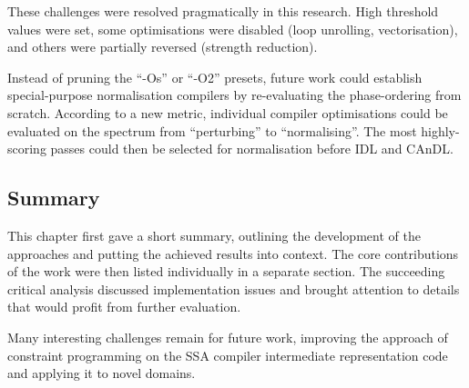     These challenges were resolved pragmatically in this research.
    High threshold values were set, some optimisations were disabled
    (loop unrolling, vectorisation), and others were partially reversed
    (strength reduction).

    Instead of pruning the ``-Os'' or ``-O2'' presets, future work could
    establish special-purpose normalisation compilers by re-evaluating the
    phase-ordering from scratch.
    According to a new metric, individual compiler optimisations could be
    evaluated on the spectrum from ``perturbing'' to ``normalising''.
    The most highly-scoring passes could then be selected for normalisation
    before IDL and CAnDL.
    
\subsection*{Summary}

    This chapter first gave a short summary, outlining the development of the
    approaches and putting the achieved results into context.
    The core contributions of the work were then listed individually in a
    separate section.
    The succeeding critical analysis discussed implementation issues and
    brought attention to details that would profit from further evaluation.

    Many interesting challenges remain for future work, improving the approach
    of constraint programming on the SSA compiler intermediate representation
    code and applying it to novel domains.
